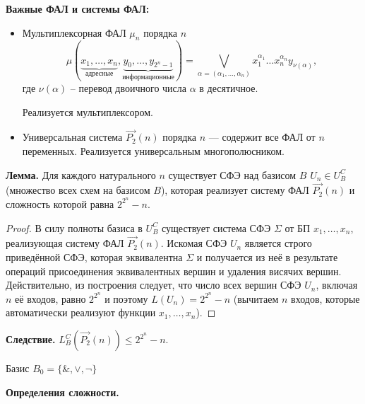 


\bigbreak
\textbf{Важные ФАЛ и системы ФАЛ:}
\begin{itemize}
    \item Мультиплексорная ФАЛ $\mu_n$ порядка $n$
    $$ \mu(\displaystyle\underbrace{x_1,\dots,x_n}_{\text{адресные}},\displaystyle\underbrace{y_0,\dots,y_{2^n-1}}_{\text{информационные}}) = \displaystyle\bigvee_{\alpha=(\alpha_1,\dots,\alpha_n)} x_1^{\alpha_1} \dots x_n^{\alpha_n} y_{\nu(\alpha)},$$
    где $\nu(\alpha)$ -- перевод двоичного числа $\alpha$ в десятичное.
    
    Реализуется мультиплексором.
    \item Универсальная система $\vec{P_2}(n)$ порядка $n$ --- содержит все ФАЛ от $n$ переменных. Реализуется универсальным многополюсником.
\end{itemize}


\bigbreak
\textbf{Лемма.} Для каждого натурального $n$ существует СФЭ над базисом $B$ $U_n \in U_B^C$(множество всех схем на базисом $B$), которая реализует систему ФАЛ $\vec{P_2}(n)$ и сложность которой равна $2^{2^n} - n$.
    
\begin{proof}
В силу полноты базиса в $U_B^C$ существует система СФЭ $\Sigma$ от БП $x_1,\dots,x_n$, реализующая систему ФАЛ $\vec{P_2}(n)$. Искомая СФЭ $U_n$ является строго приведённой СФЭ, которая эквивалентна $\Sigma$ и получается из неё в результате операций присоединения эквивалентных вершин и удаления висячих вершин. Действительно, из построения следует, что число всех вершин СФЭ $U_n$, включая $n$ её входов, равно $2^{2^n}$ и поэтому $L(U_n) = 2^{2^n} - n$ (вычитаем $n$ входов, которые автоматически реализуют функции $x_1,\dots,x_n$).
\end{proof}

\textbf{Следствие.} $L_B^C(\vec{P_2}(n)) \leqslant 2^{2^n} - n$.

\bigbreak
Базис $B_0 = \{\&, \vee, \neg\}$

\bigbreak
\textbf{Определения сложности.}
    
